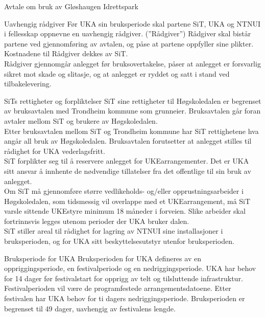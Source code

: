 \documentclass[../fsbok.tex]{subfiles}
\begin{document}
\begin{instruks*}{Avtale om bruk av Gløshaugen Idrettspark}
\begin{instruksledd}{Uavhengig rådgiver}
Før UKA sin bruksperiode skal partene SiT, UKA og NTNUI i fellesskap oppnevne en uavhengig rådgiver. (”Rådgiver”)  Rådgiver skal bistår partene ved gjennomføring av avtalen, og påse at partene oppfyller sine plikter. Kostnadene til Rådgiver dekkes av SiT.\\  

Rådgiver gjennomgår anlegget før bruksovertakelse, påser at anlegget er forsvarlig sikret mot skade og slitasje, og at anlegget er ryddet og satt i stand ved tilbakelevering.\\
\end{instruksledd}
 
\begin{instruksledd}{SiTs rettigheter og forpliktelser}
SiT sine rettigheter til Høgskoledalen er begrenset av bruksavtalen med Trondheim kommune som grunneier. Bruksavtalen går foran avtaler mellom SiT og brukere av Høgskoledalen.\\

Etter bruksavtalen mellom SiT og Trondheim kommune har SiT rettighetene hva angår all bruk av Høgskoledalen. Bruksavtalen forutsetter at anlegget stilles til rådighet for UKA vederlagsfritt.\\

SiT forplikter seg til å reservere anlegget for UKEarrangementer. Det er UKA sitt ansvar å innhente de nødvendige tillatelser fra det offentlige til sin bruk av anlegget.\\

Om SiT må gjennomføre større vedlikeholds- og/eller opprustningsarbeider i Høgskoledalen, som tidsmessig vil overlappe med et UKEarrangement, må SiT varsle sittende UKEstyre minimum 18 måneder i forveien. Slike arbeider skal fortrinnsvis legges utenom perioder der UKA bruker dalen.\\

SiT stiller areal til rådighet for lagring av NTNUI sine installasjoner i bruksperioden, og for UKA sitt beskyttelsesutstyr utenfor bruksperioden.\\
\end{instruksledd}

\begin{instruksledd}{Bruksperiode for UKA}
Bruksperioden for UKA defineres av en oppriggingsperiode, en festivalperiode og en nedriggingsperiode. UKA har behov for 14 dager før festivalstart for opprigg av telt og tilsluttende infrastruktur. Festivalperioden vil være de programfestede arrangementsdatoene. Etter festivalen har UKA behov for ti dagers nedriggingsperiode.  Bruksperioden er begrenset til 49 dager, uavhengig av festivalens lengde.\\


\end{instruksledd}
\end{instruks*}
\end{document}
